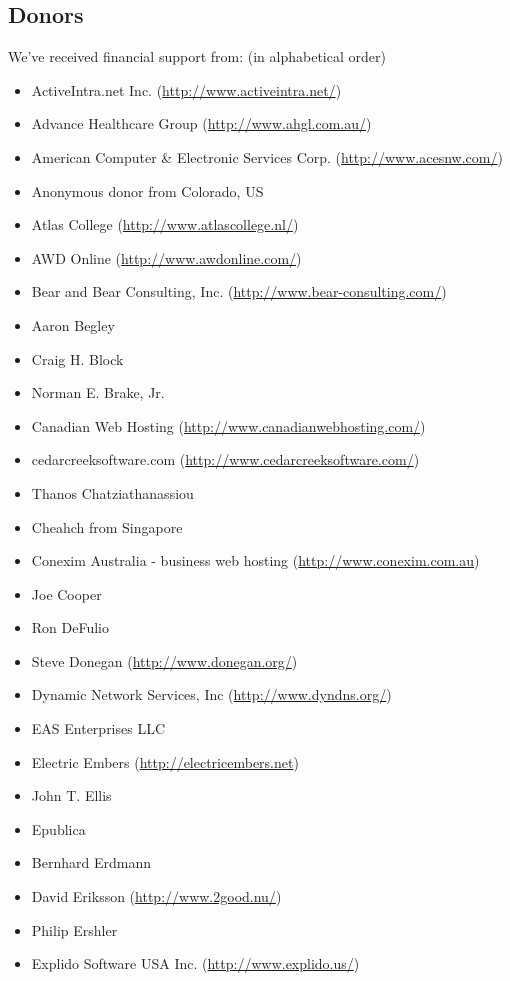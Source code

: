 \documentclass[a4paper,titlepage,12pt]{article}
\begin{document}
    \subsection{Donors}
    We've received financial support from: (in alphabetical order)
    \begin{itemize}
	\item ActiveIntra.net Inc. (\url{http://www.activeintra.net/})
	\item Advance Healthcare Group (\url{http://www.ahgl.com.au/})
	\item American Computer \& Electronic Services Corp. (\url{http://www.acesnw.com/})
	\item Anonymous donor from Colorado, US
	\item Atlas College (\url{http://www.atlascollege.nl/})
	\item AWD Online (\url{http://www.awdonline.com/})
	\item Bear and Bear Consulting, Inc. (\url{http://www.bear-consulting.com/})
	\item Aaron Begley
	\item Craig H. Block
	\item Norman E. Brake, Jr.
	\item Canadian Web Hosting (\url{http://www.canadianwebhosting.com/})
	\item cedarcreeksoftware.com (\url{http://www.cedarcreeksoftware.com/})
	\item Thanos Chatziathanassiou
	\item Cheahch from Singapore
	\item Conexim Australia - business web hosting (\url{http://www.conexim.com.au})
	\item Joe Cooper
	\item Ron DeFulio
	\item Steve Donegan (\url{http://www.donegan.org/})
	\item Dynamic Network Services, Inc (\url{http://www.dyndns.org/})
	\item EAS Enterprises LLC
	\item Electric Embers (\url{http://electricembers.net})
	\item John T. Ellis
	\item Epublica
	\item Bernhard Erdmann
	\item David Eriksson (\url{http://www.2good.nu/})
	\item Philip Ershler
	\item Explido Software USA Inc. (\url{http://www.explido.us/})

\end{itemize}
\end{document}
